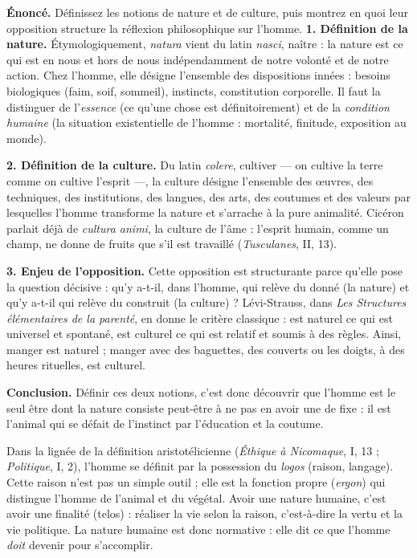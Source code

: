 \documentclass[11pt]{article}
\newcommand{\cle}[1]{{\popxbold\color{popdark}#1}}
\newcounter{popsec}
\newcounter{popsub}
\newcommand{\courssub}[1]{%
  \stepcounter{popsub}%
  \par\vspace{9pt}\noindent{\popxbold\fontsize{11.5}{13}\selectfont\color{popink}{\color{poporange}\thepopsec.\thepopsub}\hspace{6pt}#1}\par\nopagebreak\vspace{4pt}
}
\begin{document}
\begin{exoresolu}
\textbf{Énoncé.} Définissez les notions de nature et de culture, puis montrez en quoi leur opposition structure la réflexion philosophique sur l'homme.
\tcblower
\textbf{1. Définition de la nature.} Étymologiquement, \emph{natura} vient du latin \emph{nasci}, \guillemotleft naître \guillemotright : la nature est ce qui est en nous et hors de nous indépendamment de notre volonté et de notre action. Chez l'homme, elle désigne l'ensemble des dispositions innées : besoins biologiques (faim, soif, sommeil), instincts, constitution corporelle. Il faut la distinguer de l'\emph{essence} (ce qu'une chose est définitoirement) et de la \emph{condition humaine} (la situation existentielle de l'homme : mortalité, finitude, exposition au monde).

\textbf{2. Définition de la culture.} Du latin \emph{colere}, \guillemotleft cultiver \guillemotright — on cultive la terre comme on cultive l'esprit —, la culture désigne l'ensemble des œuvres, des techniques, des institutions, des langues, des arts, des coutumes et des valeurs par lesquelles l'homme transforme la nature et s'arrache à la pure animalité. Cicéron parlait déjà de \emph{cultura animi}, la \guillemotleft culture de l'âme \guillemotright : l'esprit humain, comme un champ, ne donne de fruits que s'il est travaillé (\emph{Tusculanes}, II, 13).

\textbf{3. Enjeu de l'opposition.} Cette opposition est structurante parce qu'elle pose la question décisive : qu'y a-t-il, dans l'homme, qui relève du donné (la nature) et qu'y a-t-il qui relève du construit (la culture) ? Lévi-Strauss, dans \emph{Les Structures élémentaires de la parenté}, en donne le critère classique : est naturel ce qui est universel et spontané, est culturel ce qui est relatif et soumis à des règles. Ainsi, manger est naturel ; manger avec des baguettes, des couverts ou les doigts, à des heures rituelles, est culturel.

\textbf{Conclusion.} Définir ces deux notions, c'est donc découvrir que l'homme est le seul être dont la nature consiste peut-être à ne pas en avoir une de fixe : il est l'animal qui se défait de l'instinct par l'éducation et la coutume.
\end{exoresolu}

\courssub{L'idée d'une nature humaine}

\begin{propriete}
Dans la lignée de la définition aristotélicienne (\emph{Éthique à Nicomaque}, I, 13 ; \emph{Politique}, I, 2), l'homme se définit par la possession du \emph{logos} (raison, langage). Cette raison n'est pas un simple outil ; elle est la fonction propre (\emph{ergon}) qui distingue l'homme de l'animal et du végétal. Avoir une nature humaine, c'est avoir une \cle{finalité} (telos) : réaliser la vie selon la raison, c'est-à-dire la vertu et la vie politique. La nature humaine est donc normative : elle dit ce que l'homme \emph{doit} devenir pour s'accomplir.
\end{propriete}
\end{document}
